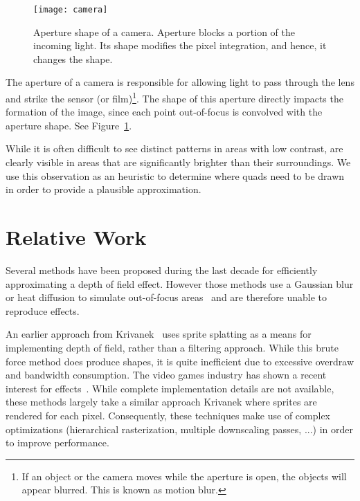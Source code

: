 	\begin{figure}[htb]\centering
	\texttt{[image: camera]}
	\caption{Aperture shape of a camera. Aperture blocks a portion of the incoming light. Its shape modifies the pixel integration, and hence, it changes the \bokeh shape. }
	\label{DeRousiers:camera}
	\end{figure}

The aperture of a camera is responsible for allowing light to pass through the lens and strike the sensor (or film)\footnote{If an object or the camera moves while the aperture is open, the objects will appear blurred. This is known as motion blur.}. The shape of this aperture directly impacts the formation of the image, since each point out-of-focus is convolved with the aperture shape. See Figure~\ref{DeRousiers:camera}.

While it is often difficult to see distinct \bokeh patterns in areas with low contrast, \bokehs are clearly visible in areas that are significantly brighter than their surroundings. We use this observation as an heuristic to determine where \bokeh quads need to be drawn in order to provide a plausible approximation.

\section{Relative Work}\label{Derousiers:RelativeWork}

Several methods have been proposed during the last decade for efficiently approximating a depth of field effect. However those methods use a Gaussian blur or heat diffusion to simulate out-of-focus areas~\cite{Hammon07,Kosloff07} and are therefore unable to reproduce \bokeh effects.

An earlier approach from Krivanek~\cite{Krivanek03} uses sprite splatting as a means for implementing depth of field, rather than a filtering approach. While this brute force method does produce \bokeh shapes, it is quite inefficient due to excessive overdraw and bandwidth consumption. The video games industry has shown a recent interest for \bokeh effects~\cite{Sousa11,Futurmark11,Mittring11}. While complete implementation details are not available, these methods largely take a similar approach Krivanek where sprites are rendered for each pixel. Consequently, these techniques make use of complex optimizations (hierarchical rasterization, multiple downscaling passes, ...) in order to improve performance. 

